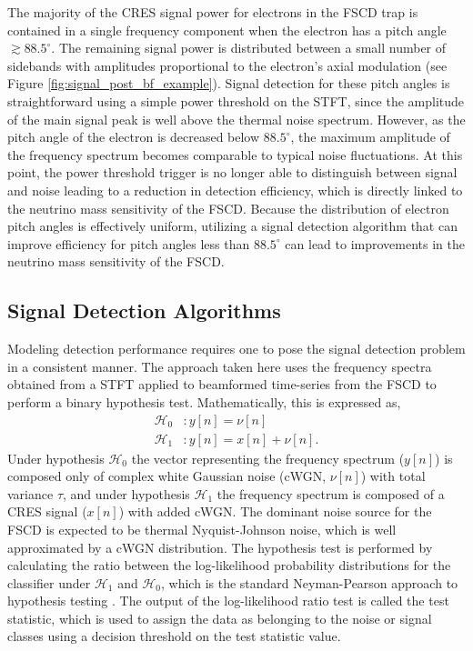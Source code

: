 The majority of the CRES signal power for electrons in the FSCD trap is contained in a single frequency component when the electron has a pitch angle $\gtrsim 88.5^\circ$. The remaining signal power is distributed between a small number of sidebands with amplitudes proportional to the electron's axial modulation (see Figure \ref{fig:signal_post_bf_example}). Signal detection for these pitch angles is straightforward using a simple power threshold on the STFT, since the amplitude of the main signal peak is well above the thermal noise spectrum. However, as the pitch angle of the electron is decreased below $88.5^\circ$, the maximum amplitude of the frequency spectrum becomes comparable to typical noise fluctuations. At this point, the power threshold trigger is no longer able to distinguish between signal and noise leading to a reduction in detection efficiency, which is directly linked to the neutrino mass sensitivity of the FSCD. Because the distribution of electron pitch angles is effectively uniform, utilizing a signal detection algorithm that can improve efficiency for pitch angles less than $88.5^\circ$ can lead to improvements in the neutrino mass sensitivity of the FSCD. 


\subsection{Signal Detection Algorithms}
\label{sec:classifiers}

Modeling detection performance requires one to pose the signal detection problem in a consistent manner. The approach taken here uses the frequency spectra obtained from a STFT applied to beamformed time-series from the FSCD to perform a binary hypothesis test. Mathematically, this is expressed as,
\begin{align}
    \mathcal{H}_0 & : y[n]=\nu[n]\\
    \mathcal{H}_1 & : y[n]=x[n]+\nu[n].
\end{align}
Under hypothesis $\mathcal{H}_0$ the vector representing the frequency spectrum ($y[n]$) is composed only of complex white Gaussian noise (cWGN, $\nu[n]$) with total variance $\tau$, and under hypothesis $\mathcal{H}_1$ the frequency spectrum is composed of a CRES signal ($x[n]$) with added cWGN. The dominant noise source for the FSCD is expected to be thermal Nyquist-Johnson noise, which is well approximated by a cWGN distribution. The hypothesis test is performed by calculating the ratio between the log-likelihood probability distributions for the classifier under $\mathcal{H}_1$ and $\mathcal{H}_0$, which is the standard Neyman-Pearson approach to hypothesis testing \cite{detection_theory}. The output of the log-likelihood ratio test is called the test statistic, which is used to assign the data as belonging to the noise or signal classes using a decision threshold on the test statistic value. 

